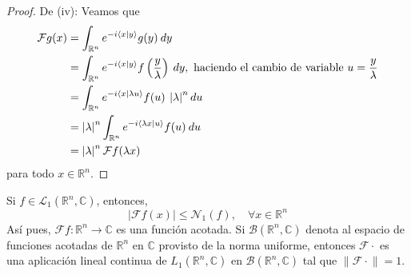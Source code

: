 \documentclass[12pt]{report}
\theoremstyle{largebreak}
\renewcommand{\leq}{\ensuremath{\leqslant}}
\newcommand\abs[1]{\ensuremath{\left|#1\right|}}
\newcommand\cf[3]{\ensuremath{#1:#2\rightarrow#3}}
\newcommand\norm[1]{\ensuremath{\|#1\|}}
\newcommand\pint[2]{\ensuremath{\langle#1| #2\rangle}}
\newcommand{\N}[2]{\ensuremath{\mathcal{N}_{#1}\left(#2\right)}}
\newcommand{\fou}[1]{\ensuremath{\mathcal{F}#1}}
\begin{document}
\begin{proof}
        De (iv): Veamos que
        \begin{equation*}
            \begin{split}
                \fou{g}(x)&=\int_{\mathbb{R}^n}e^{-i\pint{x}{y}}g(y)\:dy\\
                &=\int_{\mathbb{R}^n}e^{-i\pint{x}{y}}f\left(\frac{y}{\lambda}\right) \:dy,\textup{ haciendo el cambio de variable }u=\frac{y}{\lambda} \\
                &=\int_{\mathbb{R}^n}e^{-i\pint{x}{\lambda u}}f(u) \:\abs{\lambda}^n du\\
                &=\abs{\lambda}^n\int_{\mathbb{R}^n}e^{-i\pint{\lambda x}{ u}}f(u) \:du\\
                &=\abs{\lambda}^n\fou{f}(\lambda x)\\
            \end{split}
        \end{equation*}
        para todo $x\in\mathbb{R}^n$.
    \end{proof}

    \begin{theor}
        Si $f\in\mathcal{L}_1(\mathbb{R}^n,\mathbb{C})$, entonces,
        \begin{equation*}
            \abs{\fou{f}(x)}\leq\N{1}{f},\quad\forall x\in\mathbb{R}^n
        \end{equation*}
        Así pues, $\cf{\fou{f}}{\mathbb{R}^n}{\mathbb{C}}$ es una función acotada. Si $\mathcal{B}(\mathbb{R}^n,\mathbb{C})$ denota al espacio de funciones acotadas de $\mathbb{R}^n$ en $\mathbb{C}$ provisto de la norma uniforme, entonces $\fou{\cdot}$ es una aplicación lineal continua de $L_1(\mathbb{R}^n,\mathbb{C})$ en $\mathcal{B}(\mathbb{R}^n,\mathbb{C})$ tal que $\norm{\fou{\cdot}}=1$.
    \end{theor}
\end{document}
